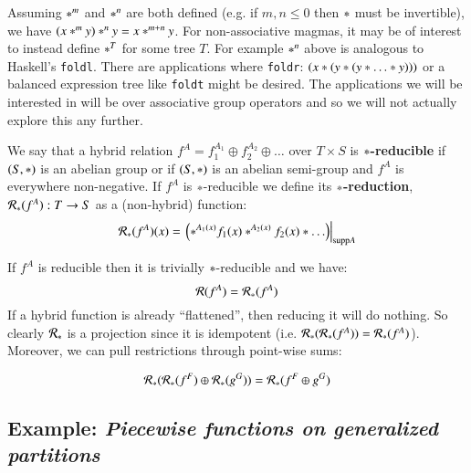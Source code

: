 Assuming $*^m$ and $*^n$ are both defined (e.g. if $m,n \leq 0$ then $*$ must be invertible),
we have $ ( x *^m y ) *^n y = x *^{m+n} y$.
For non-associative magmas, it may be of interest to instead define $*^T$ for some tree $T$. 
For example $*^n$ above is analogous to Haskell's \texttt{foldl}.
There are applications where \texttt{foldr}: $(x * ( y * ( y * \ldots * y)))$ or a balanced expression tree like \texttt{foldt} might be desired.
The applications we will be interested in will be over associative group operators and so we will not actually 
explore this any further.

\begin{definition}
	We say that a hybrid relation $f^A = f_1^{A_1} \oplus f_2^{A_2} \oplus \ldots$ over $T \times S$ 
	is $*$\textbf{-reducible} if $(S, *)$ is an abelian group 
	or if $(S, *)$ is an abelian semi-group and $f^A$ is everywhere non-negative.
	If $f^A$ is $*$-reducible we define its $*$\textbf{-reduction}, $\mathcal{R}_*(f^A) :  T \to S$ 
	as a (non-hybrid) function:
	\begin{equation}
		\mathcal{R}_* (f^A)(x) = \left.\left(*^{A_1(x)} f_1(x) *^{A_2(x)} f_2(x) * \ldots \right)\right|_{\text{supp} A}
	\end{equation}
\end{definition}


If $f^A$ is reducible then it is trivially $*$-reducible and we have:
\begin{equation}
	\mathcal{R}(f^A) = \mathcal{R}_*(f^A)
\end{equation}
If a hybrid function is already ``flattened'', then reducing it will do nothing.
So clearly $\mathcal{R}_*$ is a projection since it is idempotent  (i.e. $\mathcal{R}_* ( \mathcal{R}_*( f^A)) = \mathcal{R}_*(f^A)$).
Moreover, we can pull restrictions through point-wise sums:

\begin{equation}
	\mathcal{R}_*( \mathcal{R}_*(f^F) \oplus \mathcal{R}_*(g^G)) =\mathcal{R}_*( f^F \oplus g^G)
\end{equation}



\subsection{Example: \emph{Piecewise functions on generalized partitions}} 

